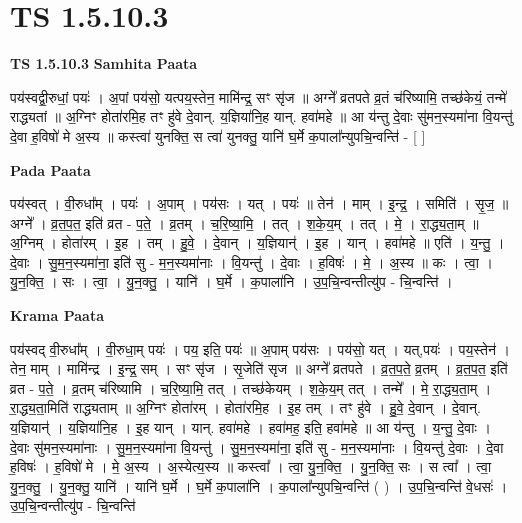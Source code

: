 \documentclass[17pt]{extarticle}
\begin{document}
\section*{ TS 1.5.10.3 }

\textbf{TS 1.5.10.3 } \newline
\textbf{Samhita Paata} \newline

पय॑स्वद्वी॒रुधां॒ पयः॑ । अ॒पां पय॑सो॒ यत्पय॒स्तेन॒ मामि॑न्द्र॒ सꣳ सृ॑ज ॥ अग्ने᳚ व्रतपते व्र॒तं च॑रिष्यामि॒ तच्छ॑केयं॒ तन्मे॑ राद्ध्यतां ॥ अ॒ग्निꣳ होता॑रमि॒ह तꣳ हु॑वे दे॒वान्. य॒ज्ञिया॑नि॒ह यान्. हवा॑महे ॥ आ य॑न्तु दे॒वाः सु॑मन॒स्यमा॑ना वि॒यन्तु॑ दे॒वा ह॒विषो॑ मे अ॒स्य ॥ कस्त्वा॑ युनक्ति॒ स त्वा॑ युनक्तु॒ यानि॑ घ॒र्मे क॒पाला᳚न्युपचि॒न्वन्ति॑ - [ ] \newline

\textbf{Pada Paata} \newline

पय॑स्वत् । वी॒रुधा᳚म् । पयः॑ । अ॒पाम् । पय॑सः । यत् । पयः॑ ॥ तेन॑ । माम् । इ॒न्द्र॒ । समिति॑ । सृ॒ज॒ ॥ अग्ने᳚ । व्र॒त॒प॒त॒ इति॑ व्रत - प॒ते॒ । व्र॒तम् । च॒रि॒ष्या॒मि॒ । तत् । श॒के॒य॒म् । तत् । मे॒ । रा॒द्ध्य॒ता॒म् ॥ अ॒ग्निम् । होता॑रम् । इ॒ह । तम् । हु॒वे॒ । दे॒वान् । य॒ज्ञियान्॑ । इ॒ह । यान् । हवा॑महे ॥ एति॑ । य॒न्तु॒ । दे॒वाः । सु॒म॒न॒स्यमा॑ना॒ इति॑ सु - म॒न॒स्यमा॑नाः । वि॒यन्तु॑ । दे॒वाः । ह॒विषः॑ । मे॒ । अ॒स्य ॥ कः । त्वा॒ । यु॒न॒क्ति॒ । सः । त्वा॒ । यु॒न॒क्तु॒ । यानि॑ । घ॒र्मे । क॒पाला॑नि । उ॒प॒चि॒न्वन्तीत्यु॑प - चि॒न्वन्ति॑ ।  \newline


\textbf{Krama Paata} \newline

पय॑स्वद् वी॒रुधा᳚म् । वी॒रुधा॒म् पयः॑ । पय॒ इति॒ पयः॑ ॥ अ॒पाम् पय॑सः । पय॑सो॒ यत् । यत्,पयः॑ । पय॒स्तेन॑ । तेन॒ माम् । मामि॑न्द्र । इ॒न्द्र॒ सम् । सꣳ सृ॑ज । सृ॒जेति॑ सृज ॥ अग्ने᳚ व्रतपते । व्र॒त॒प॒ते॒ व्र॒तम् । व्र॒त॒प॒त॒ इति॑ व्रत - प॒ते॒ । व्र॒तम् च॑रिष्यामि । च॒रि॒ष्या॒मि॒ तत् । तच्छ॑केयम् । श॒के॒य॒म् तत् । तन्मे᳚ । मे॒ रा॒द्ध्य॒ता॒म् । रा॒द्ध्य॒ता॒मिति॑ राद्ध्यताम् ॥ अ॒ग्निꣳ होता॑रम् । होता॑रमि॒ह । इ॒ह तम् । तꣳ हु॑वे । हु॒वे॒ दे॒वान् । दे॒वान्. य॒ज्ञियान्॑ । य॒ज्ञिया॑नि॒ह । इ॒ह यान् । यान्. हवा॑महे । हवा॑मह॒ इति॒ हवा॑महे ॥ आ य॑न्तु । य॒न्तु॒ दे॒वाः । दे॒वाः सु॑मन॒स्यमा॑नाः । सु॒म॒न॒स्यमा॑ना वि॒यन्तु॑ । सु॒म॒न॒स्यमा॑ना॒ इति॑ सु - म॒न॒स्यमा॑नाः । वि॒यन्तु॑ दे॒वाः । दे॒वा ह॒विषः॑ । ह॒विषो॑ मे । मे॒ अ॒स्य । अ॒स्येत्य॒स्य ॥ कस्त्वा᳚ । त्वा॒ यु॒न॒क्ति॒ । यु॒न॒क्ति॒ सः । स त्वा᳚ । त्वा॒ यु॒न॒क्तु॒ । यु॒न॒क्तु॒ यानि॑ । यानि॑ घ॒र्मे । घ॒र्मे क॒पाला॑नि । क॒पाला᳚न्युपचि॒न्वन्ति॑ ( ) । उ॒प॒चि॒न्वन्ति॑ वे॒धसः॑ । उ॒प॒चि॒न्वन्तीत्यु॑प - चि॒न्वन्ति॑ \newline
\end{document}
